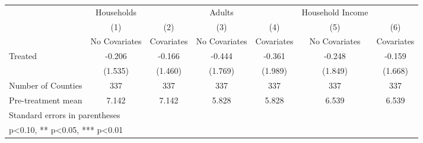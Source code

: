 {
\def\sym#1{\ifmmode^{#1}\else\(^{#1}\)\fi}
\begin{tabular}{l*{6}{c}}
\hline\hline
            &  Households   &               &      Adults   &               &Household Income   &               \\
            &\multicolumn{1}{c}{(1)}&\multicolumn{1}{c}{(2)}&\multicolumn{1}{c}{(3)}&\multicolumn{1}{c}{(4)}&\multicolumn{1}{c}{(5)}&\multicolumn{1}{c}{(6)}\\
            &\multicolumn{1}{c}{No Covariates}&\multicolumn{1}{c}{Covariates}&\multicolumn{1}{c}{No Covariates}&\multicolumn{1}{c}{Covariates}&\multicolumn{1}{c}{No Covariates}&\multicolumn{1}{c}{Covariates}\\
\hline
Treated     &      -0.206   &      -0.166   &      -0.444   &      -0.361   &      -0.248   &      -0.159   \\
            &     (1.535)   &     (1.460)   &     (1.769)   &     (1.989)   &     (1.849)   &     (1.668)   \\
\hline
Number of Counties&         337   &         337   &         337   &         337   &         337   &         337   \\
Pre-treatment mean&       7.142   &       7.142   &       5.828   &       5.828   &       6.539   &       6.539   \\
\hline\hline
\multicolumn{7}{l}{\footnotesize Standard errors in parentheses}\\
\multicolumn{7}{l}{\footnotesize * p<0.10, ** p<0.05, *** p<0.01}\\
\end{tabular}
}
